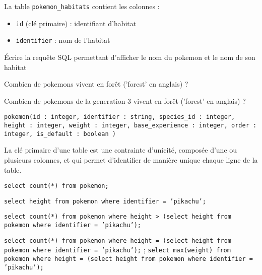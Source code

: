 La table \texttt{pokemon\_habitats} contient les colonnes :

\begin{itemize}[itemsep=0mm]
	\item \texttt{id} (clé primaire) : identifiant d'habitat
	\item \texttt{identifier} : nom de l'habitat
\end{itemize}

\question{}
\'Ecrire la requête SQL permettant d'afficher le nom du pokemon et le nom de son habitat

\question{}
Combien de pokemons vivent en forêt ('forest' en anglais) ?

\question{}
Combien de pokemons de la generation 3 vivent en forêt ('forest' en anglais) ?





\begin{qexo}
\end{qexo}
\texttt{pokemon(id : integer, identifier : string, species\_id : integer, height : integer, weight : integer, base\_experience : integer, order : integer, is\_default : boolean )} 

\begin{qexo}
\end{qexo}
La clé primaire d'une table est une contrainte d'unicité, composée d'une ou plusieurs colonnes, et qui permet d'identifier de manière unique chaque ligne de la table.


\begin{qexo}
\end{qexo}
\texttt{select count(*) from pokemon;}  

\begin{qexo}
\end{qexo}
\texttt{select height from pokemon where identifier = 'pikachu';}  

\begin{qexo}
\end{qexo}
\texttt{select count(*) from pokemon where height > (select height from pokemon where identifier = 'pikachu');}  

\begin{qexo}
\end{qexo}
\texttt{select count(*) from pokemon where height = (select height from pokemon where identifier = 'pikachu');}  ;
\texttt{select max(weight) from pokemon where height = (select height from pokemon where identifier = 'pikachu');} 

